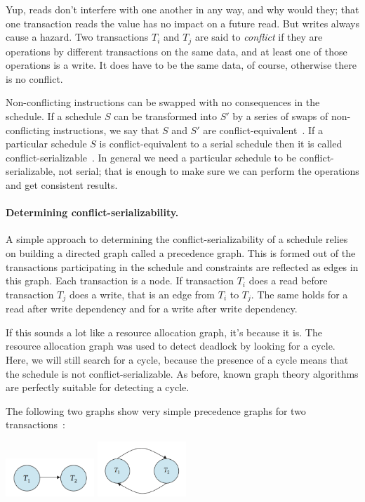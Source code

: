 Yup, reads don't interfere with one another in any way, and why would they; that one transaction reads the value has no impact on a future read. But writes always cause a hazard. Two transactions $T_{i}$ and $T_{j}$ are said to \textit{conflict} if they are operations by different transactions on the same data, and at least one of those operations is a write. It does have to be the same data, of course, otherwise there is no conflict.

Non-conflicting instructions can be swapped with no consequences in the schedule. If a schedule $S$ can be transformed into $S'$ by a series of swaps of non-conflicting instructions, we say that $S$ and $S'$ are conflict-equivalent~\cite{dsc}. If a particular schedule $S$ is conflict-equivalent to a serial schedule then it is called conflict-serializable~\cite{dsc}. In general we need a particular schedule to be conflict-serializable, not serial; that is enough to make sure we can perform the operations and get consistent results.

\paragraph{Determining conflict-serializability.} A simple approach to determining the conflict-serializability of a schedule relies on building a directed graph called a precedence graph. This is formed out of the transactions participating in the schedule and constraints are reflected as edges in this graph. Each transaction is a node. If transaction $T_{i}$ does a read before transaction $T_{j}$ does a write, that is an edge from $T_{i}$ to $T_{j}$. The same holds for a read after write dependency and for a write after write dependency. 

If this sounds a lot like a resource allocation graph, it's because it is. The resource allocation graph was used to detect deadlock by looking for a cycle. Here, we will still search for a cycle, because the presence of a cycle means that the schedule is not conflict-serializable. As before, known graph theory algorithms are perfectly suitable for detecting a cycle.

The following two graphs show very simple precedence graphs for two transactions~\cite{dsc}:

\begin{center}
\includegraphics[width=0.25\textwidth]{images/precedence-1}
\includegraphics[width=0.25\textwidth]{images/precedence-2}
\end{center}

